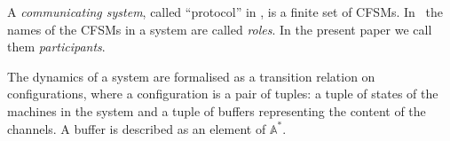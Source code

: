 %
% 
%

A {\em communicating system}, called ``protocol'' in \cite{BZ83}, is a finite set of CFSMs.
 In~\cite{CF05,DY12,TY15} the names of the CFSMs in a system are called {\em roles}. In the present paper we call them {\em participants}.
 

The dynamics of a system are
formalised as a transition relation on configurations, where a configuration is a
pair of tuples: a tuple of states of the machines in the system and a tuple of buffers representing the content of the channels. A buffer is described as an element of $\mathbb{A^*}$. 

